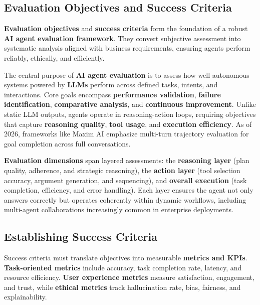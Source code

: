 
\begin{TNtwocol}
\section{Evaluation Objectives and Success Criteria}

\textbf{Evaluation objectives} and \textbf{success criteria} form the foundation of a robust \textbf{AI agent evaluation framework}. They convert subjective assessment into systematic analysis aligned with business requirements, ensuring agents perform reliably, ethically, and efficiently.
​

The central purpose of \textbf{AI agent evaluation} is to assess how well autonomous systems powered by \textbf{LLMs} perform across defined tasks, intents, and interactions. Core goals encompass \textbf{performance validation}, \textbf{failure identification}, \textbf{comparative analysis}, and \textbf{continuous improvement}. Unlike static LLM outputs, agents operate in reasoning-action loops, requiring objectives that capture \textbf{reasoning quality}, \textbf{tool usage}, and \textbf{execution efficiency}. As of 2026, frameworks like Maxim AI emphasize multi-turn trajectory evaluation for goal completion across full conversations.
​

\textbf{Evaluation dimensions} span layered assessments: the \textbf{reasoning layer} (plan quality, adherence, and strategic reasoning), the \textbf{action layer} (tool selection accuracy, argument generation, and sequencing), and \textbf{overall execution} (task completion, efficiency, and error handling). Each layer ensures the agent not only answers correctly but operates coherently within dynamic workflows, including multi-agent collaborations increasingly common in enterprise deployments.
​

\subsection*{Establishing Success Criteria}
Success criteria must translate objectives into measurable \textbf{metrics and KPIs}. \textbf{Task-oriented metrics} include accuracy, task completion rate, latency, and resource efficiency. \textbf{User experience metrics} measure satisfaction, engagement, and trust, while \textbf{ethical metrics} track hallucination rate, bias, fairness, and explainability.


\end{TNtwocol}
